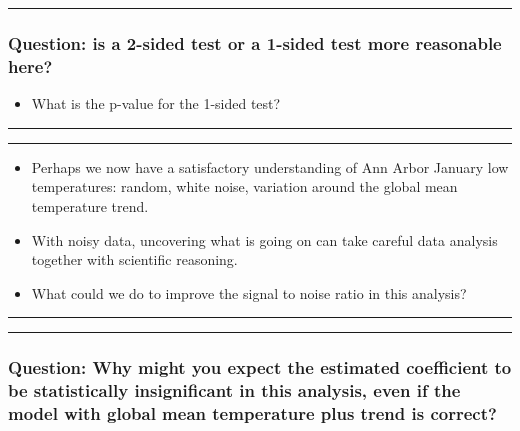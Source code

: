 \documentclass[]{article}
\providecommand{\tightlist}{%
  \setlength{\itemsep}{0pt}\setlength{\parskip}{0pt}}
\begin{document}
\begin{center}\rule{0.5\linewidth}{\linethickness}\end{center}

\subsubsection{Question: is a 2-sided test or a 1-sided test more
reasonable
here?}\label{question-is-a-2-sided-test-or-a-1-sided-test-more-reasonable-here}

\begin{itemize}
\tightlist
\item
  What is the p-value for the 1-sided test?
\end{itemize}

\begin{center}\rule{0.5\linewidth}{\linethickness}\end{center}

\begin{center}\rule{0.5\linewidth}{\linethickness}\end{center}

\begin{itemize}
\item
  Perhaps we now have a satisfactory understanding of Ann Arbor January
  low temperatures: random, white noise, variation around the global
  mean temperature trend.
\item
  With noisy data, uncovering what is going on can take careful data
  analysis together with scientific reasoning.
\item
  What could we do to improve the signal to noise ratio in this
  analysis?
\end{itemize}

\begin{center}\rule{0.5\linewidth}{\linethickness}\end{center}

\begin{center}\rule{0.5\linewidth}{\linethickness}\end{center}

\subsubsection{Question: Why might you expect the estimated coefficient
to be statistically insignificant in this analysis, even if the model
with global mean temperature plus trend is
correct?}\label{question-why-might-you-expect-the-estimated-coefficient-to-be-statistically-insignificant-in-this-analysis-even-if-the-model-with-global-mean-temperature-plus-trend-is-correct}
\end{document}
